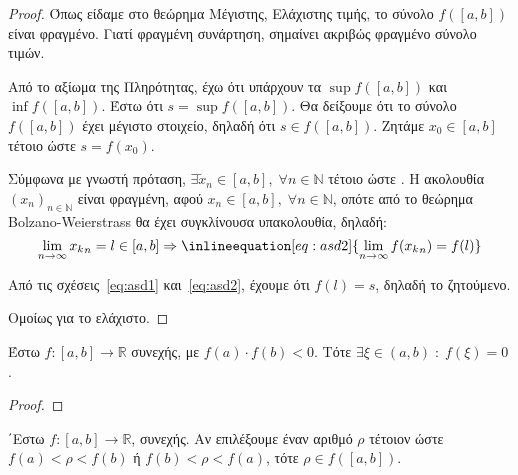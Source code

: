 \documentclass[main.tex]{subfiles}
\begin{document}
\begin{proof}
    Όπως είδαμε στο θεώρημα Μέγιστης, Ελάχιστης τιμής, το σύνολο $ f([a,b]) $ είναι 
    φραγμένο. Γιατί φραγμένη συνάρτηση, σημαίνει ακριβώς φραγμένο σύνολο τιμών. 

    Από το αξίωμα της Πληρότητας, έχω ότι υπάρχουν τα $ \sup f([a,b]) $ και 
    $ \inf f([a,b]) $. Έστω ότι $ s = \sup f([a,b]) $. Θα δείξουμε ότι το σύνολο 
    $ f([a,b]) $ έχει μέγιστο στοιχείο, δηλαδή ότι $ s \in f([a,b]) $. Ζητάμε 
    $ x_{0} \in [a,b] $ τέτοιο ώστε $ s = f(x_{0}) $.

    Σύμφωνα με γνωστή πρόταση, $ \exists \tilde{x}_{n} \in [a,b], \; 
    \forall n \in \mathbb{N} $ τέτοιο ώστε 
    . 
    Η ακολουθία $ {(x_{n})}_{n \in \mathbb{N}} $ είναι φραγμένη, αφού 
    $ x_{n} \in [a,b], \; \forall n \in \mathbb{N} $, οπότε από το θεώρημα 
    Bolzano-Weierstrass θα έχει συγκλίνουσα υπακολουθία, δηλαδή:
    \[
        \lim_{n \to \infty} {x_{k}}_{n} = l \in [a,b] \Rightarrow 
        \inlineequation[eq:asd2]{\lim_{n \to \infty} f({x_{k}}_{n}) = f(l)}
    \]

    Από τις σχέσεις~\eqref{eq:asd1} και~\eqref{eq:asd2}, έχουμε ότι $ f(l) =s $, 
    δηλαδή το ζητούμενο.

    Ομοίως για το ελάχιστο.
\end{proof}

\begin{thm}[Bolzano]
    Έστω $ f \colon [a,b] \to \mathbb{R} $ συνεχής, με $ f(a) \cdot f(b) <0 $. 
    Τότε $ \exists \xi \in (a,b) \; : \; f(\xi) = 0 $.
\end{thm}

\begin{proof}
\end{proof}

\begin{thm}
    ΄Εστω $ f \colon [a,b] \to \mathbb{R} $, συνεχής. Αν επιλέξουμε έναν αριθμό 
    $ \rho $ τέτοιον ώστε $ f(a) < \rho < f(b) $ ή $ f(b) < \rho < f(a) $, τότε 
    $ \rho \in f([a,b]) $.
\end{thm}
\end{document}
